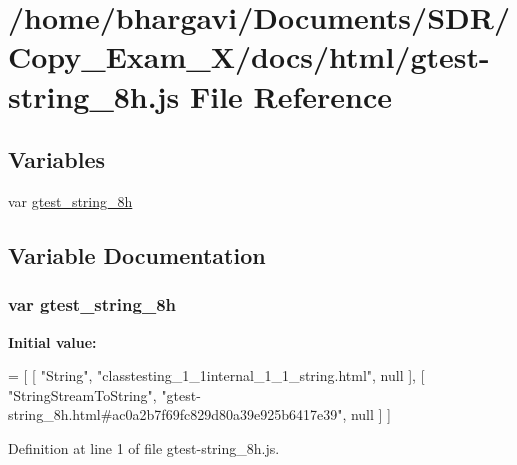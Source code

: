 \hypertarget{gtest-string__8h_8js}{}\section{/home/bhargavi/\+Documents/\+S\+D\+R/\+Copy\+\_\+\+Exam\+\_\+X/docs/html/gtest-\/string\+\_\+8h.js File Reference}
\label{gtest-string__8h_8js}
\subsection*{Variables}
\begin{DoxyCompactItemize}
\item 
var \hyperlink{gtest-string__8h_8js_aa045c7d87dc9c543d934da9eb74a93bb}{gtest\+\_\+string\+\_\+8h}
\end{DoxyCompactItemize}


\subsection{Variable Documentation}
\subsubsection[{\texorpdfstring{gtest\+\_\+string\+\_\+8h}{gtest_string_8h}}]{\setlength{\rightskip}{0pt plus 5cm}var gtest\+\_\+string\+\_\+8h}\hypertarget{gtest-string__8h_8js_aa045c7d87dc9c543d934da9eb74a93bb}{}\label{gtest-string__8h_8js_aa045c7d87dc9c543d934da9eb74a93bb}
{\bfseries Initial value\+:}
\begin{DoxyCode}
=
[
    [ \textcolor{stringliteral}{"String"}, \textcolor{stringliteral}{"classtesting\_1\_1internal\_1\_1\_string.html"}, null ],
    [ \textcolor{stringliteral}{"StringStreamToString"}, \textcolor{stringliteral}{"gtest-string\_8h.html#ac0a2b7f69fc829d80a39e925b6417e39"}, null ]
]
\end{DoxyCode}


Definition at line 1 of file gtest-\/string\+\_\+8h.\+js.

